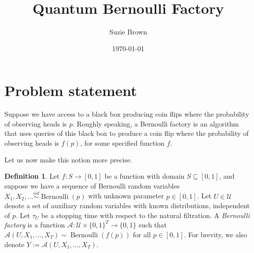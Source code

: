 \documentclass{article}
\title{Quantum Bernoulli Factory}
\author{Suzie Brown}
\date{\today}
\theoremstyle{definition}
\newtheorem{defn}{Definition}
\newcommand{\iidsim}{\overset{iid}{\sim}}
\newcommand{\Bern}{\operatorname{Bernoulli}}
\newcommand{\A}{\mathcal{A}}
\begin{document}
\maketitle
\section*{Problem statement}
Suppose we have access to a black box producing coin flips where the probability of observing heads is $p$. Roughly speaking, a Bernoulli factory is an algorithm that uses queries of this black box to produce a coin flip where the probability of observing heads is $f(p)$, for some specified function $f$.

Let us now make this notion more precise.
\begin{defn}\label{defn:bern_fact}
Let $f: S\to[0,1]$ be a function with domain $S \subseteq [0,1]$, and suppose we have a sequence of Bernoulli random variables $X_1,X_2,\dots \iidsim \Bern(p)$ with unknown parameter $p \in [0,1]$. 
Let $U \in \mathcal{U}$ denote a set of auxiliary random variables with known distributions, independent of $p$. Let $\tau_U$ be a stopping time with respect to the natural filtration.
A \emph{Bernoulli factory} is a function $\A : \mathcal{U} \times \{0,1\}^T \to\{0,1\}$ such that $\A(U,X_1,\dots,X_T) \sim \Bern(f(p))$ for all $p \in [0,1]$. For brevity, we also denote $Y := \A(U,X_1,\dots,X_T)$.
\end{defn}
\end{document}
